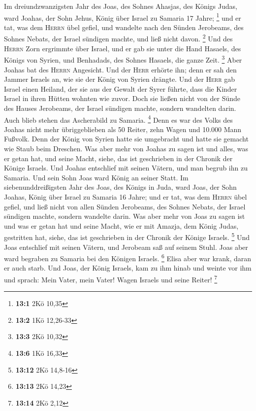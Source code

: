  Im dreiundzwanzigsten Jahr des Joas, des Sohnes Ahasjas,
des Königs Judas, ward Joahas, der Sohn Jehus, König über Israel zu
Samaria 17 Jahre; \footnote{\textbf{13:1} 2Kö 10,35}  und
er tat, was dem \textsc{Herrn} übel gefiel, und wandelte nach den Sünden
Jerobeams, des Sohnes Nebats, der Israel sündigen machte, und ließ nicht
davon. \footnote{\textbf{13:2} 1Kö 12,26-33}  Und des
\textsc{Herrn} Zorn ergrimmte über Israel, und er gab sie unter die Hand
Hasaels, des Königs von Syrien, und Benhadads, des Sohnes Hasaels, die
ganze Zeit. \footnote{\textbf{13:3} 2Kö 10,32}  Aber
Joahas bat des \textsc{Herrn} Angesicht. Und der \textsc{Herr} erhörte
ihn; denn er sah den Jammer Israels an, wie sie der König von Syrien
drängte.  Und der \textsc{Herr} gab Israel einen Heiland,
der sie aus der Gewalt der Syrer führte, dass die Kinder Israel in ihren
Hütten wohnten wie zuvor.  Doch sie ließen nicht von der
Sünde des Hauses Jerobeams, der Israel sündigen machte, sondern
wandelten darin. Auch blieb stehen das Ascherabild zu Samaria.
\footnote{\textbf{13:6} 1Kö 16,33}  Denn es war des Volks
des Joahas nicht mehr übriggeblieben als 50 Reiter, zehn Wagen und
10.000 Mann Fußvolk. Denn der König von Syrien hatte sie umgebracht und
hatte sie gemacht wie Staub beim Dreschen.  Was aber mehr
von Joahas zu sagen ist und alles, was er getan hat, und seine Macht,
siehe, das ist geschrieben in der Chronik der Könige Israels.
 Und Joahas entschlief mit seinen Vätern, und man begrub
ihn zu Samaria. Und sein Sohn Joas ward König an seiner Statt.
 Im siebenunddreißigsten Jahr des Joas, des Königs in
Juda, ward Joas, der Sohn Joahas, König über Israel zu Samaria 16 Jahre;
 und er tat, was dem \textsc{Herrn} übel gefiel, und ließ
nicht von allen Sünden Jerobeams, des Sohnes Nebats, der Israel sündigen
machte, sondern wandelte darin.  Was aber mehr von Joas
zu sagen ist und was er getan hat und seine Macht, wie er mit Amazja,
dem König Judas, gestritten hat, siehe, das ist geschrieben in der
Chronik der Könige Israels. \footnote{\textbf{13:12} 2Kö 14,8-16}
 Und Joas entschlief mit seinen Vätern, und Jerobeam saß
auf seinem Stuhl. Joas aber ward begraben zu Samaria bei den Königen
Israels. \footnote{\textbf{13:13} 2Kö 14,23}  Elisa aber
war krank, daran er auch starb. Und Joas, der König Israels, kam zu ihm
hinab und weinte vor ihm und sprach: Mein Vater, mein Vater! Wagen
Israels und seine Reiter! \footnote{\textbf{13:14} 2Kö 2,12}
